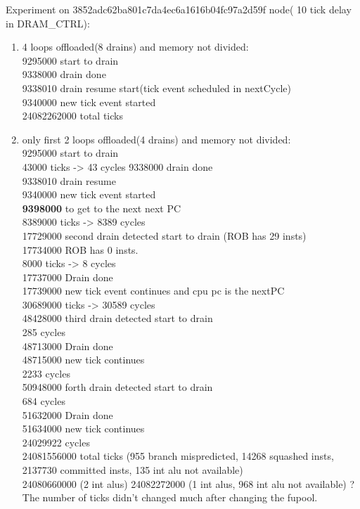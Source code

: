 \documentclass[11pt]{article}
\begin{document}
Experiment on 3852adc62ba801c7da4ec6a1616b04fc97a2d59f node( 10 tick delay in DRAM\_CTRL):
\begin{enumerate}
	\item 4 loops offloaded(8 drains) and memory not divided: \\
	
	9295000 start to drain\\
	9338000 drain done \\
	9338010 drain resume start(tick event scheduled in nextCycle)\\
	9340000 new tick event started\\
	24082262000 total ticks
	
	\item only first 2 loops offloaded(4 drains) and memory not divided:\\
	
	9295000 start to drain\\
	43000 ticks -> 43 cycles
	9338000 drain done\\
  9338010 drain resume\\
  9340000 new tick event started\\
  \textbf{9398000} to get to the next next PC\\
  8389000 ticks -> 8389 cycles\\
  17729000 second drain detected start to drain (ROB has 29 insts)\\
  17734000 ROB has 0 insts.\\
  8000 ticks -> 8 cycles\\
  17737000 Drain done\\
  17739000 new tick event continues and cpu pc is the nextPC\\
  30689000 ticks -> 30589 cycles\\
  48428000 third drain detected start to drain\\
  285 cycles\\
  48713000 Drain done\\
  48715000 new tick continues\\
  2233 cycles\\
  50948000 forth drain detected start to drain\\
  684 cycles\\
  51632000 Drain done\\
  51634000 new tick continues\\
  24029922 cycles\\
  24081556000 total ticks (955 branch mispredicted, 14268 squashed insts, 2137730 committed insts, 135 int alu not available)\\
  24080660000 (2 int alus)
  24082272000 (1 int alus, 968 int alu not available) ?
  The number of ticks didn't changed much after changing the fupool.
  

\end{enumerate}
\end{document}
